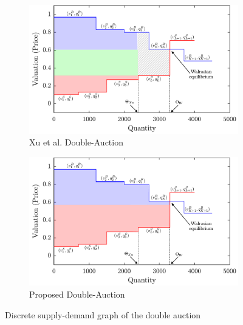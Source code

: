 \begin{enumerate}
\begin{figure}[h]%
\centering
\begin{subfigure}{0.7\columnwidth}
\includegraphics[width=\columnwidth]{Figures/sd_XU.pdf}%
\caption{Xu et al. Double-Auction}%
\label{sd_conventional}%
\end{subfigure}\hfill%
\begin{subfigure}{0.7\columnwidth}
\includegraphics[width=\columnwidth]{Figures/sd_proposed.pdf}%
\caption{Proposed Double-Auction}%
\label{balanced_Utility}%
\end{subfigure}\hfill%
\caption{Discrete supply-demand graph of the double auction}
\label{sd_proposed}%
\label{sd}
\end{figure}


\end{enumerate}
